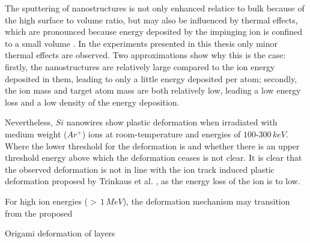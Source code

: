 The sputtering of nanostructures is not only enhanced relatice to bulk because of the high surface to volume ratio, but may also be influenced by thermal effects, which are pronounced because energy deposited by the impinging ion is confined to a small volume \cite{greaves_enhanced_2013,ilinov_sputtering_2014,nietiadi_sputtering_2014,anders_sputtering_2015,urbassek_sputter_2015}. In the experiments presented in this thesis only minor thermal effects are observed. Two approximations show why this is the case: firstly, the nanostructures are relatively large compared to the ion energy deposited in them, leading to only a little energy deposited per atom; secondly, the ion mass and target atom mass are both relatively low, leading a low energy loss and a low density of the energy deposition.

Nevertheless, $Si$ nanowires show plastic deformation when irradiated with medium weight ($Ar^+$) ions at room-temperature and energies of $100$-$300\,keV$. Where the lower threshold for the deformation is and whether there is an upper threshold energy above which the deformation ceases is not clear. It is clear that the observed deformation is not in line with the ion track induced plastic deformation proposed by Trinkaus et al. \cite{trinkaus_viscoelastic_1995}, as the energy loss of the ion is to low. 

For high ion energies ($>\,1\,MeV$), the deformation mechanism may transition from the proposed 

Origami
deformation of layers
 


